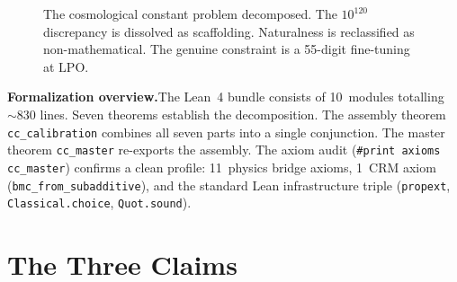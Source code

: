 \documentclass[11pt,a4paper]{article}
\theoremstyle{plain}
\theoremstyle{definition}
\newcommand{\LPO}{\ensuremath{\mathrm{LPO}}}
\newcommand{\BISH}{\ensuremath{\mathrm{BISH}}}
\newcommand{\Lobs}{\Lambda_{\mathrm{obs}}}
\newcommand{\Lbare}{\Lambda_{\mathrm{bare}}}
\newcommand{\MPl}{M_{\mathrm{Planck}}}
\begin{document}
\begin{figure}[ht]
\centering
{}
\caption{The cosmological constant problem decomposed.
  The $10^{120}$ discrepancy is dissolved as scaffolding.
  Naturalness is reclassified as non-mathematical.
  The genuine constraint is a 55-digit fine-tuning at $\LPO$.}
\label{fig:decomposition}
\end{figure}

\medskip\noindent
\textbf{Formalization overview.}\quad  The Lean~4 bundle consists of
10~modules totalling ${\sim}830$ lines.  Seven theorems establish
the decomposition.  The assembly theorem \texttt{cc\_calibration}
combines all seven parts into a single conjunction.  The master
theorem \texttt{cc\_master} re-exports the assembly.  The axiom
audit (\texttt{\#print axioms cc\_master}) confirms a clean profile:
11~physics bridge axioms, 1~CRM axiom (\texttt{bmc\_from\_subadditive}),
and the standard Lean infrastructure triple (\texttt{propext},
\texttt{Classical.choice}, \texttt{Quot.sound}).

\section{The Three Claims}\label{sec:claims}
\end{document}
